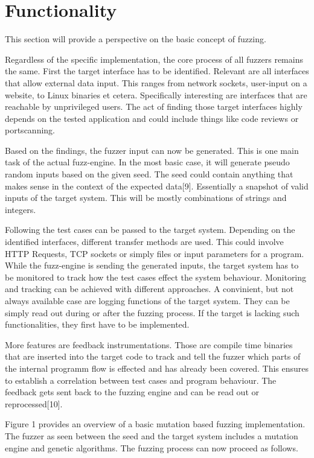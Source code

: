 \documentclass[journal=tosc,final]{iacrtrans}
\begin{document}
\section{Functionality}
This section will provide a perspective on the basic concept of fuzzing.

Regardless of the specific implementation, the core process of all fuzzers remains the same. First the target interface has to be identified. Relevant are all interfaces that allow external data input. This ranges from network sockets, user-input on a website, to Linux binaries et cetera. Specifically interesting are interfaces that are reachable by unprivileged users. The act of finding those target interfaces highly depends on the tested application and could include things like code reviews or portscanning. 


Based on the findings, the fuzzer input can now be generated. This is one main task of the actual fuzz-engine. In the most basic case, it will generate pseudo random inputs based on the given seed. The seed could contain anything that makes sense in the context of the expected data[9]. Essentially a snapshot of valid inputs of the target system. This will be mostly combinations of strings and integers. 

Following the test cases can be passed to the  target system. Depending on the identified interfaces, different transfer methods are used. This could involve HTTP Requests, TCP sockets or simply files or input parameters for a program. While the fuzz-engine is sending the generated inputs, the target system has to be monitored to track how the test cases effect the system behaviour. Monitoring and tracking can be achieved with different approaches. A convinient, but not always available case are logging functions of the target system. They can be simply read out during or after the fuzzing process. If the target is lacking such functionalities, they first have to be implemented. 

More features are feedback instrumentations. Those are compile time binaries that are inserted into the target code to track and tell the fuzzer which parts of the internal programm flow is effected and has already been covered. This ensures to establish a correlation between test cases and program behaviour. The feedback gets sent back to the fuzzing engine and can be read out or reprocessed[10].
\newpage

Figure 1 provides an overview of a basic mutation based fuzzing implementation. The fuzzer as seen between the seed and the target system includes a mutation engine and genetic algorithms. The fuzzing process can now proceed as follows.
\end{document}

